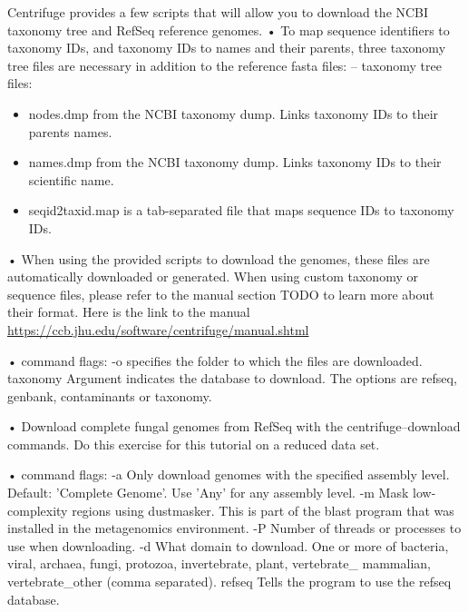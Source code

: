 \documentclass[
]{book}
\newenvironment{Shaded}{\begin{snugshade}}{\end{snugshade}}
\newcommand{\AttributeTok}[1]{\textcolor[rgb]{0.77,0.63,0.00}{#1}}
\newcommand{\BuiltInTok}[1]{#1}
\newcommand{\CommentTok}[1]{\textcolor[rgb]{0.56,0.35,0.01}{\textit{#1}}}
\newcommand{\ExtensionTok}[1]{#1}
\newcommand{\NormalTok}[1]{#1}
\newcommand{\VariableTok}[1]{\textcolor[rgb]{0.00,0.00,0.00}{#1}}
\begin{document}
Centrifuge provides a few scripts that will allow you to download the NCBI taxonomy tree and RefSeq reference
genomes.
• To map sequence identifiers to taxonomy IDs, and taxonomy IDs to names and their parents, three taxonomy tree files are
necessary in addition to the reference fasta files:
-- taxonomy tree files:

\begin{itemize}
\item
  nodes.dmp from the NCBI taxonomy dump. Links taxonomy IDs to their parents names.
\item
  names.dmp from the NCBI taxonomy dump. Links taxonomy IDs to their scientific name.
\item
  seqid2taxid.map is a tab-separated file that maps sequence IDs to taxonomy IDs.
\end{itemize}

• When using the provided scripts to download the genomes, these files are automatically downloaded or generated. When
using custom taxonomy or sequence files, please refer to the manual section TODO to learn more about their format. Here
is the link to the manual \url{https://ccb.jhu.edu/software/centrifuge/manual.shtml}

• command flags:
-o
specifies the folder to which the files are downloaded.
taxonomy
Argument indicates the database to download. The options are refseq, genbank, contaminants or taxonomy.

\begin{Shaded}
\end{Shaded}

• Download complete fungal genomes from RefSeq with the centrifuge--download commands. Do this exercise for this tutorial
on a reduced data set.

• command flags:
-a Only download genomes with the specified assembly level. Default: 'Complete Genome'. Use 'Any' for any assembly
level.
-m Mask low-complexity regions using dustmasker. This is part of the blast program that was installed in the metagenomics
environment.
-P Number of threads or processes to use when downloading.
-d What domain to download. One or more of bacteria, viral, archaea, fungi, protozoa, invertebrate, plant, vertebrate\_
mammalian, vertebrate\_other (comma separated).
refseq Tells the program to use the refseq database.
\end{document}
